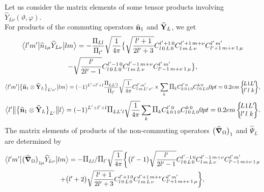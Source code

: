 Let us consider the matrix elements of some tensor products involving \(\widehat{Y}_{L \nu}(\vartheta, \varphi)\).\\
For products of the commuting operators \(\widehat{\mathbf{n}}_{1}\) and \(\widehat{\mathbf{Y}}_{L}\), we get
\begin{multline}
\braOket{l^{\prime} m^{\prime}}{\widehat{n}_{1 \mu} \widehat{Y}_{L \nu}}{ l m}=-\frac{\Fact{L l}}{\Fact{l^\prime}}\sqrt{\frac{1}{4 \pi}}\bigl\{\sqrt{\frac{l^{\prime}+1}{2 l^{\prime}+3}}
\clebsch{l}{0}{L}{0}{l^{\prime}+1}{0}
\clebsch{l}{m}{L}{\nu}{l^{\prime}+1}{m+\nu} \clebsch{l^{\prime}+1}{m+\nu}{1}{\mu}{l^{\prime}}{m^{\prime}}\\
-\sqrt{\frac{l^{\prime}}{2 l^{\prime}-1}}
\clebsch{l}{0}{L}{0}{l^{\prime}-1}{0}
\clebsch{l}{m}{L}{\nu}{l^{\prime}-1}{m+\nu}
\clebsch{l^{\prime}-1}{m+\nu}{1}{\mu}{l^{\prime}}{m^{\prime}}\bigr\},  \label{eq:13:2:108}
\end{multline}
\begin{equation}
\braOket{ l^{\prime} m^{\prime}}{\bigl\{\widehat{\vect{n}}_{1} \otimes \widehat{\vect{Y}}_{L}\bigr\}_{L^{\prime} \nu^{\prime}}}{l m}=(-1)^{L^{\prime}+l^{\prime}+l} \frac{\Fact{ L L^\prime l}}{\Fact{l^\prime}}\sqrt{\frac{1}{4 \pi}}
\clebsch{l}{m}{L^{\prime}}{\nu^{\prime}}{l^{\prime}}{m^{\prime}}
\times \sum_{k} \Fact{k}
\clebsch{k}{0}{1}{0}{l^{\prime}}{0} 
\clebsch{l}{0}{L}{0}{k}{0}
\sixj{L}{1}{L^{\prime}}{l^{\prime}}{l}{k}, \label{eq:13:2:109}
\end{equation}
\begin{equation*}
\braOketred{ l^{\prime}}{\bigl\{\widehat{\vect{n}}_{1} \otimes \widehat{\vect{Y}}_{L}\bigr\}_{L^{\prime}}}{ l}=(-1)^{L^{\prime}+l^{\prime}+l} \Fact{ L L^\prime l}\sqrt{\frac{1}{4 \pi}} 
 \sum_{k} \Fact{k}
\clebsch{k}{0}{1}{0}{l^{\prime}}{0}
\clebsch{l}{0}{L}{0}{k}{0}
\sixj{L}{1}{L^{\prime}}{l^{\prime}}{l}{k}.
\end{equation*}
The matrix elements of products of the non-commuting operators \(\bigl(\widehat{\boldsymbol{\nabla}}_{\Omega}\bigr)_{1}\) and \(\widehat{\Psi}_{L}\) are determined by
\begin{multline}
\braOket{ l^{\prime} m^{\prime}}{\bigl(\delop_{\Omega}\bigr)_{1 \mu} \widehat{Y}_{L \nu}}{l m}=-\Fact{L l}/\Fact{l^\prime}\sqrt{\frac{1}{4 \pi}}\biggl\{\bigl(l^{\prime}-1\bigr) \sqrt{\frac{l^{\prime}}{2 l^{\prime}-1}} 
\clebsch{l}{0}{L}{0}{l^{\prime}-1}{0} 
\clebsch{l}{m}{L}{\nu}{l^{\prime}-1}{m+\nu} 
\clebsch{l^{\prime}-1}{m+\nu}{1}{\mu}{l^{\prime}}{m^{\prime}}
\\ +
\bigl(l^{\prime}+2\bigr) \sqrt{\frac{l^{\prime}+1}{2 l^{\prime}+3}}
\clebsch{l}{0}{L}{0}{l^{\prime}+1}{0}
\clebsch{l}{m}{L}{\nu}{l^{\prime}+1}{m+\nu}
\clebsch{l^{\prime}+1}{m+\nu}{1}{\mu}{l^{\prime}}{m^{\prime}}\biggr\},  \label{eq:13:2:110}
\end{multline}
